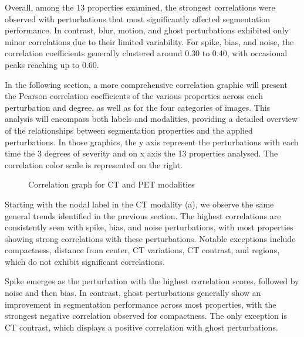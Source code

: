 Overall, among the 13 properties examined, the strongest correlations were observed with perturbations that most significantly affected segmentation performance. In contrast, blur, motion, and ghost perturbations exhibited only minor correlations due to their limited variability. For spike, bias, and noise, the correlation coefficients generally clustered around 0.30 to 0.40, with occasional peaks reaching up to 0.60.

In the following section, a more comprehensive correlation graphic will present the Pearson correlation coefficients of the various properties across each perturbation and degree, as well as for the four categories of images. This analysis will encompass both labels and modalities, providing a detailed overview of the relationships between segmentation properties and the applied perturbations.
\newpage
In those graphics, the y axis represent the perturbations with each time the 3 degrees of severity and on x axis the 13 properties analysed.
The correlation color scale is represented on the right.
\begin{figure}[ht]
    \centering
    \hfill
    \hfill
    \vfill
    \hfill
    \hfill
    \caption{Correlation graph for CT and PET modalities}
    \label{fig:four_subfigures}
\end{figure}
\newpage
Starting with the nodal label in the CT modality (a), we observe the same general trends identified in the previous section. The highest correlations are consistently seen with spike, bias, and noise perturbations, with most properties showing strong correlations with these perturbations. Notable exceptions include compactness, distance from center, CT variations, CT contrast, and regions, which do not exhibit significant correlations.

Spike emerges as the perturbation with the highest correlation scores, followed by noise and then bias. In contrast, ghost perturbations generally show an improvement in segmentation performance across most properties, with the strongest negative correlation observed for compactness. The only exception is CT contrast, which displays a positive correlation with ghost perturbations.

